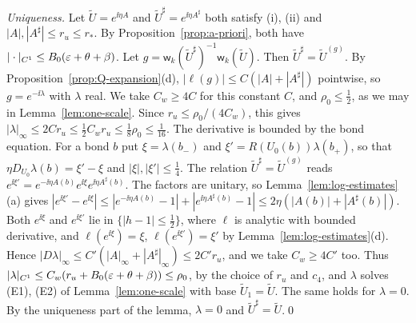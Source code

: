 \emph{Uniqueness.} Let $\tilde U=e^{\ii\eta A}$ and $\tilde U^\sharp=e^{\ii\eta A^\sharp}$ both satisfy (i), (ii) and $|A|,|A^\sharp|\le r_u\le r_*$. By Proposition~\ref{prop:a-priori}, both have $|\cdot|_{C^1}\le B_0(\varepsilon+\theta+\beta)$. Let $g=\mathsf w_k(\tilde U^\sharp)^{-1}\mathsf w_k(\tilde U)$. Then $\tilde U^\sharp=\tilde U^{(g)}$. By Proposition~\ref{prop:Q-expansion}(d), $|\ell(g)|\le C(|A|+|A^\sharp|)$ pointwise, so $g=e^{-\ii\lambda}$ with $\lambda$ real. We take $C_w\ge4C$ for this constant $C$, and $\rho_0\le\frac12$, as we may in Lemma~\ref{lem:one-scale}. Since $r_u\le\rho_0/(4C_w)$, this gives $|\lambda|_\infty\le2Cr_u\le\frac12C_wr_u\le\frac18\rho_0\le\frac1{16}$. The derivative is bounded by the bond equation. For a bond $b$ put $\xi=\lambda(b_-)$ and $\xi'=R(U_0(b))\lambda(b_+)$, so that $\eta D_{U_0}\lambda(b)=\xi'-\xi$ and $|\xi|,|\xi'|\le\frac14$. The relation $\tilde U^\sharp=\tilde U^{(g)}$ reads $e^{\ii\xi'}=e^{-\ii\eta A(b)}e^{\ii\xi}e^{\ii\eta A^\sharp(b)}$. The factors are unitary, so Lemma~\ref{lem:log-estimates}(a) gives $|e^{\ii\xi'}-e^{\ii\xi}|\le|e^{-\ii\eta A(b)}-1|+|e^{\ii\eta A^\sharp(b)}-1|\le2\eta(|A(b)|+|A^\sharp(b)|)$. Both $e^{\ii\xi}$ and $e^{\ii\xi'}$ lie in $\{|h-1|\le\frac12\}$, where $\ell$ is analytic with bounded derivative, and $\ell(e^{\ii\xi})=\xi$, $\ell(e^{\ii\xi'})=\xi'$ by Lemma~\ref{lem:log-estimates}(d). Hence $|D\lambda|_\infty\le C'(|A|_\infty+|A^\sharp|_\infty)\le2C'r_u$, and we take $C_w\ge4C'$ too. Thus $|\lambda|_{C^1}\le C_w(r_u+B_0(\varepsilon+\theta+\beta))\le\rho_0$, by the choice of $r_u$ and $c_4$, and $\lambda$ solves (E1), (E2) of Lemma~\ref{lem:one-scale} with base $\tilde U_1=\tilde U$. The same holds for $\lambda=0$. By the uniqueness part of the lemma, $\lambda=0$ and $\tilde U^\sharp=\tilde U$.\qed
